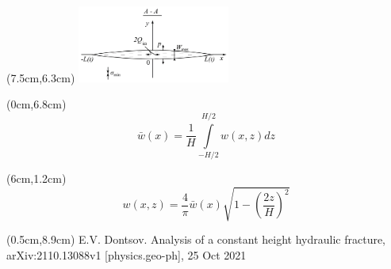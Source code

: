 \documentclass{beamer}
\begin{document}
\begin{frame}
\begin{textblock*}{7cm}(7.5cm,6.3cm)
\includegraphics[width=5cm]{pkn_model_A-A_plane.jpg}
\end{textblock*}

\begin{textblock*}{3.7cm}(0cm,6.8cm)
\tiny
$$
\boxed{
\bar{w}(x)=\frac{1}{H}\!\int\limits_{-H/2}^{H/2}{w(x,z)dz}
}
$$
\end{textblock*}

\begin{textblock*}{7cm}(6cm,1.2cm)
\tiny
$$
w(x,z)=\frac{4}{\pi}\bar{w}(x)\sqrt{1-\left(\frac{2z}{H}\right)^2}
$$
\end{textblock*}

\begin{textblock*}{6cm}(0.5cm,8.9cm)
\tiny
\textcolor{lit_gray}{E.V. Dontsov. Analysis of a constant height hydraulic fracture, arXiv:2110.13088v1 [physics.geo-ph], 25 Oct 2021}
\end{textblock*}

\normalsize

\end{frame}
\end{document}
